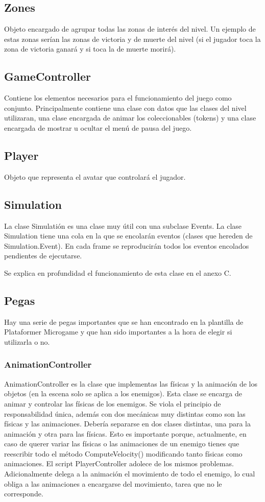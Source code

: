 \subsection{Zones}
Objeto encargado de agrupar todas las zonas de interés del nivel. Un ejemplo de estas zonas serían las zonas de victoria y de muerte del nivel (si el jugador toca la zona de victoria ganará y si toca la de muerte morirá).

\subsection{GameController}
Contiene los elementos necesarios para el funcionamiento del juego como conjunto. Principalmente contiene una clase con datos que las clases del nivel utilizaran, una clase encargada de animar los coleccionables (tokens) y una clase encargada de mostrar u ocultar el menú de pausa del juego.

\subsection{Player}
Objeto que representa el avatar que controlará el jugador.

\subsection{Simulation}
La clase Simulatión es una clase muy útil con una subclase Events. La clase Simulation tiene una cola en la que se encolarán eventos (clases que hereden de Simulation.Event). En cada frame se reproducirán todos los eventos encolados pendientes de ejecutarse.

Se explica en profundidad el funcionamiento de esta clase en el anexo C.

\subsection{Pegas}
Hay una serie de pegas importantes que se han encontrado en la plantilla de Plataformer Microgame y que han sido importantes a la hora de elegir si utilizarla o no.

\subsubsection{AnimationController}
AnimationController es la clase que implementas las físicas y la animación de los objetos (en la escena solo se aplica a los enemigos).
Esta clase se encarga de animar y controlar las físicas de los enemigos. Se viola el principio de responsabilidad única, además con dos mecánicas muy distintas como son las físicas y las animaciones. Debería separarse en dos clases distintas, una para la animación y otra para las físicas. Esto es importante porque, actualmente, en caso de querer variar las físicas o las animaciones de un enemigo tienes que reescribir todo el método ComputeVelocity() modificando tanto físicas como animaciones. El script PlayerController adolece de los mismos problemas. 
Adicionalmente delega a la animación el movimiento de todo el enemigo, lo cual obliga a las animaciones a encargarse del movimiento, tarea que no le corresponde.


